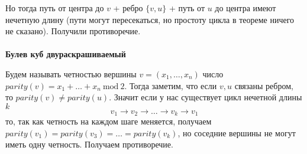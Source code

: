 Но тогда путь от центра до $v$ + ребро $\{v, u\}$ + путь от $u$ до центра имеют нечетную длину (пути могут пересекаться, но простоту цикла в теореме ничего не сказано). Получили противоречие. \\ \\

\noindent \textbf{Булев куб двураскрашиваемый}

Будем называть четностью вершины $v = (x_1, \dots, x_n)$ число $parity(v) = x_1 + \dots + x_n
\ \text{mod}\ 2$. Тогда заметим, что если $v, u$ связаны ребром, то $parity(v) \neq parity(u)$. Значит если у нас существует цикл нечетной длины $k$
\[
v_1 \to v_2 \to \dots \to v_k \to v_1
\]
то, так как четность на каждом шаге меняется, получаем $parity(v_1) = parity(v_3) = \dots = parity(v_k)$, но соседние вершины не могут иметь одну четность. Получаем противоречие.